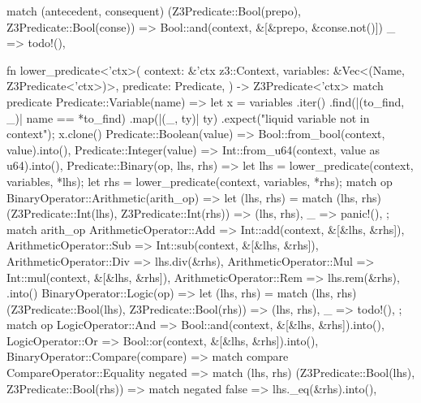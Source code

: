 \documentclass[
  oneside,
  english,
  coorientadorbanca,
  noabntexcite
]{ufsc-thesis-rn46-2019}
\begin{document}
\begin{rustcode}
{    match (antecedent, consequent) {
        (Z3Predicate::Bool(prepo), Z3Predicate::Bool(conse)) => {
            Bool::and(context, &[&prepo, &conse.not()])
        }
        _ => todo!(),
    }
}

fn lower_predicate<'ctx>(
    context: &'ctx z3::Context,
    variables: &Vec<(Name, Z3Predicate<'ctx>)>,
    predicate: Predicate,
) -> Z3Predicate<'ctx> {
    match predicate {
        Predicate::Variable(name) => {
            let x = variables
                .iter()
                .find(|(to_find, _)| name == *to_find)
                .map(|(_, ty)| ty)
                .expect("liquid variable not in context");
            x.clone()
        }
        Predicate::Boolean(value) => Bool::from_bool(context, value).into(),
        Predicate::Integer(value) => Int::from_u64(context, value as u64).into(),
        Predicate::Binary(op, lhs, rhs) => {
            let lhs = lower_predicate(context, variables, *lhs);
            let rhs = lower_predicate(context, variables, *rhs);
            match op {
                BinaryOperator::Arithmetic(arith_op) => {
                    let (lhs, rhs) = match (lhs, rhs) {
                        (Z3Predicate::Int(lhs), Z3Predicate::Int(rhs)) => (lhs, rhs),
                        _ => panic!(),
                    };
                    match arith_op {
                        ArithmeticOperator::Add => Int::add(context, &[&lhs, &rhs]),
                        ArithmeticOperator::Sub => Int::sub(context, &[&lhs, &rhs]),
                        ArithmeticOperator::Div => lhs.div(&rhs),
                        ArithmeticOperator::Mul => Int::mul(context, &[&lhs, &rhs]),
                        ArithmeticOperator::Rem => lhs.rem(&rhs),
                    }
                    .into()
                }
                BinaryOperator::Logic(op) => {
                    let (lhs, rhs) = match (lhs, rhs) {
                        (Z3Predicate::Bool(lhs), Z3Predicate::Bool(rhs)) => (lhs, rhs),
                        _ => todo!(),
                    };
                    match op {
                        LogicOperator::And => Bool::and(context, &[&lhs, &rhs]).into(),
                        LogicOperator::Or => Bool::or(context, &[&lhs, &rhs]).into(),
                    }
                }
                BinaryOperator::Compare(compare) => match compare {
                    CompareOperator::Equality { negated } => match (lhs, rhs) {
                        (Z3Predicate::Bool(lhs), Z3Predicate::Bool(rhs)) => match negated {
                            false => lhs._eq(&rhs).into(),
}}}}}}}
\end{rustcode}
\end{document}
